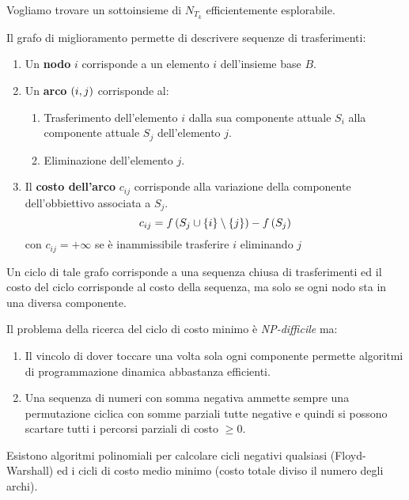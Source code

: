 \documentclass[\main/main.tex]{subfiles}
\begin{document}
\begin{multicols}{2}
\begin{observation}
    Vogliamo trovare un sottoinsieme di \(N_{T_k}\) efficientemente esplorabile.
\end{observation}
\begin{definition}
    Il grafo di miglioramento permette di descrivere sequenze di trasferimenti:
    \begin{enumerate}
        \item Un \textbf{nodo} \(i\) corrisponde a un elemento \(i\) dell'insieme base \(B\).
        \item Un \textbf{arco} \(\left(i,j\right)\) corrisponde al:
        \begin{enumerate}
            \item Trasferimento dell'elemento \(i\) dalla sua componente attuale \(S_i\) alla componente attuale \(S_j\) dell'elemento \(j\).
            \item Eliminazione dell'elemento \(j\).
        \end{enumerate}
        \item Il \textbf{costo dell'arco} \(c_{ij}\) corrisponde alla variazione della componente dell'obbiettivo associata a \(S_j\).
        \[
            c_{ij} = f\left(S_j \cup \left\{i\right\} \setminus \left\{j\right\}\right) - f\left(S_j\right)
        \]
        con \(c_{ij} = +\infty\) se è inammissibile trasferire \(i\) eliminando \(j\)
    \end{enumerate}
    Un ciclo di tale grafo corrisponde a una sequenza chiusa di trasferimenti ed il costo del ciclo corrisponde al costo della sequenza, ma solo se ogni nodo sta in una diversa componente.
\end{definition}
\begin{observation}
    Il problema della ricerca del ciclo di costo minimo è \textit{NP-difficile} ma:
    \begin{enumerate}
        \item Il vincolo di dover toccare una volta sola ogni componente permette algoritmi di programmazione dinamica abbastanza efficienti.
        \item Una sequenza di numeri con somma negativa ammette sempre una permutazione ciclica con somme parziali tutte negative e quindi si possono scartare tutti i percorsi parziali di costo \(\geq 0\).
    \end{enumerate}
\end{observation}
\begin{observation}
    Esistono algoritmi polinomiali per calcolare cicli negativi qualsiasi (Floyd-Warshall) ed i cicli di costo medio minimo (costo totale diviso il numero degli archi).


\end{observation}
\end{multicols}
\end{document}

